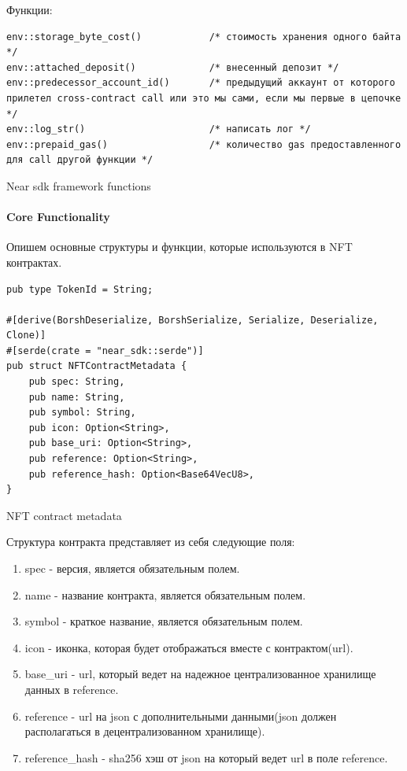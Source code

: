 Функции:
\begin{listing}[H]
\begin{verbatim}
env::storage_byte_cost()            /* стоимость хранения одного байта */
env::attached_deposit()             /* внесенный депозит */
env::predecessor_account_id()       /* предыдущий аккаунт от которого прилетел cross-contract call или это мы сами, если мы первые в цепочке */
env::log_str()                      /* написать лог */
env::prepaid_gas()                  /* количество gas предоставленного для call другой функции */
\end{verbatim}
\caption{Near sdk framework functions}
\label{near.functions}
\end{listing}

\paragraph{Core Functionality}

Опишем основные структуры и функции\cite{corestandard}, которые используются в NFT контрактах.

\begin{listing}[H]
\begin{verbatim}
pub type TokenId = String;

#[derive(BorshDeserialize, BorshSerialize, Serialize, Deserialize, Clone)]
#[serde(crate = "near_sdk::serde")]
pub struct NFTContractMetadata {
    pub spec: String,
    pub name: String,
    pub symbol: String,
    pub icon: Option<String>,
    pub base_uri: Option<String>,
    pub reference: Option<String>,
    pub reference_hash: Option<Base64VecU8>,
}
\end{verbatim}
\caption{NFT contract metadata}
\label{nftcontract.metadata}
\end{listing}

Структура контракта представляет из себя следующие поля:
\begin{enumerate}
\item spec - версия, является обязательным полем.
\item name - название контракта, является обязательным полем.
\item symbol - краткое название, является обязательным полем.
\item icon - иконка, которая будет отображаться вместе с контрактом(url).
\item base\_uri - url, который ведет на надежное централизованное хранилище данных в reference.
\item reference - url на json с дополнительными данными(json должен располагаться в децентрализованном хранилище).
\item reference\_hash - sha256 хэш от json на который ведет url в поле reference.
\end{enumerate}

